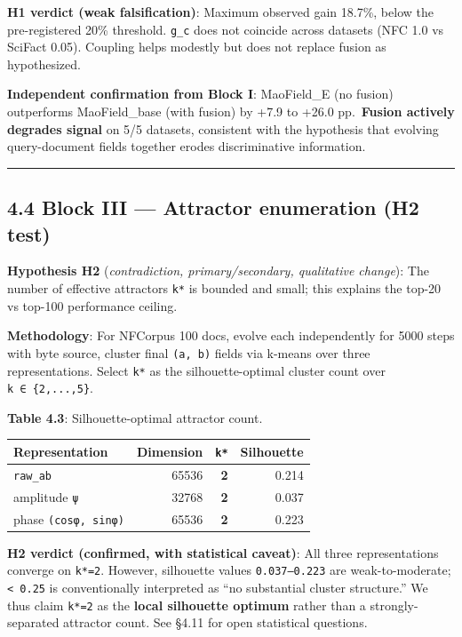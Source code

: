 \documentclass[
]{article}
\begin{document}
\textbf{H1 verdict (weak falsification)}: Maximum observed gain 18.7\%,
below the pre-registered 20\% threshold. \texttt{g\_c} does not coincide
across datasets (NFC 1.0 vs SciFact 0.05). Coupling helps modestly but
does not replace fusion as hypothesized.

\textbf{Independent confirmation from Block I}: MaoField\_E (no fusion)
outperforms MaoField\_base (with fusion) by +7.9 to +26.0
pp.~\textbf{Fusion actively degrades signal} on 5/5 datasets, consistent
with the hypothesis that evolving query-document fields together erodes
discriminative information.

\begin{center}\rule{0.5\linewidth}{0.5pt}\end{center}

\hypertarget{block-iii-attractor-enumeration-h2-test}{%
\subsection{4.4 Block III --- Attractor enumeration (H2
test)}\label{block-iii-attractor-enumeration-h2-test}}

\textbf{Hypothesis H2} (\emph{contradiction, primary/secondary,
qualitative change}): The number of effective attractors \texttt{k*} is
bounded and small; this explains the top-20 vs top-100 performance
ceiling.

\textbf{Methodology}: For NFCorpus 100 docs, evolve each independently
for 5000 steps with byte source, cluster final \texttt{(a,\ b)} fields
via k-means over three representations. Select \texttt{k*} as the
silhouette-optimal cluster count over \texttt{k\ ∈\ \{2,...,5\}}.

\textbf{Table 4.3}: Silhouette-optimal attractor count.

\begin{longtable}[]{@{}lrrr@{}}
\toprule\noalign{}
Representation & Dimension & \texttt{k*} & Silhouette \\
\midrule\noalign{}
\endhead
\bottomrule\noalign{}
\endlastfoot
\texttt{raw\_ab} & 65536 & \textbf{2} & 0.214 \\
amplitude \texttt{\textbar{}ψ\textbar{}} & 32768 & \textbf{2} & 0.037 \\
phase \texttt{(cosφ,\ sinφ)} & 65536 & \textbf{2} & 0.223 \\
\end{longtable}

\textbf{H2 verdict (confirmed, with statistical caveat)}: All three
representations converge on \texttt{k*=2}. However, silhouette values
\texttt{0.037–0.223} are weak-to-moderate; \texttt{\textless{}\ 0.25} is
conventionally interpreted as ``no substantial cluster structure.'' We
thus claim \texttt{k*=2} as the \textbf{local silhouette optimum} rather
than a strongly-separated attractor count. See §4.11 for open
statistical questions.
\end{document}
